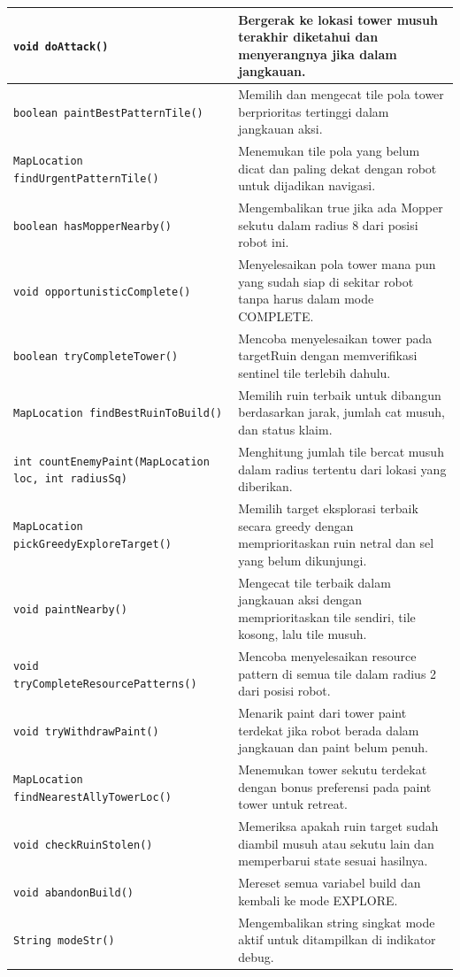 \documentclass{article}
\begin{document}
\begin{enumerate}[label=\alph*.]
\begin{longtable}{|p{}|p{}|}
\hline
\texttt{void doAttack()} & Bergerak ke lokasi tower musuh terakhir diketahui dan menyerangnya jika dalam jangkauan. \\
\hline
\texttt{boolean paintBestPatternTile()} & Memilih dan mengecat tile pola tower berprioritas tertinggi dalam jangkauan aksi. \\
\hline
\texttt{MapLocation findUrgentPatternTile()} & Menemukan tile pola yang belum dicat dan paling dekat dengan robot untuk dijadikan navigasi. \\
\hline
\texttt{boolean hasMopperNearby()} & Mengembalikan true jika ada Mopper sekutu dalam radius 8 dari posisi robot ini. \\
\hline
\texttt{void opportunisticComplete()} & Menyelesaikan pola tower mana pun yang sudah siap di sekitar robot tanpa harus dalam mode COMPLETE. \\
\hline
\texttt{boolean tryCompleteTower()} & Mencoba menyelesaikan tower pada targetRuin dengan memverifikasi sentinel tile terlebih dahulu. \\
\hline
\texttt{MapLocation findBestRuinToBuild()} & Memilih ruin terbaik untuk dibangun berdasarkan jarak, jumlah cat musuh, dan status klaim. \\
\hline
\texttt{int countEnemyPaint(MapLocation loc, int radiusSq)} & Menghitung jumlah tile bercat musuh dalam radius tertentu dari lokasi yang diberikan. \\
\hline
\texttt{MapLocation pickGreedyExploreTarget()} & Memilih target eksplorasi terbaik secara greedy dengan memprioritaskan ruin netral dan sel yang belum dikunjungi. \\
\hline
\texttt{void paintNearby()} & Mengecat tile terbaik dalam jangkauan aksi dengan memprioritaskan tile sendiri, tile kosong, lalu tile musuh. \\
\hline
\texttt{void tryCompleteResourcePatterns()} & Mencoba menyelesaikan resource pattern di semua tile dalam radius 2 dari posisi robot. \\
\hline
\texttt{void tryWithdrawPaint()} & Menarik paint dari tower paint terdekat jika robot berada dalam jangkauan dan paint belum penuh. \\
\hline
\texttt{MapLocation findNearestAllyTowerLoc()} & Menemukan tower sekutu terdekat dengan bonus preferensi pada paint tower untuk retreat. \\
\hline
\texttt{void checkRuinStolen()} & Memeriksa apakah ruin target sudah diambil musuh atau sekutu lain dan memperbarui state sesuai hasilnya. \\
\hline
\texttt{void abandonBuild()} & Mereset semua variabel build dan kembali ke mode EXPLORE. \\
\hline
\texttt{String modeStr()} & Mengembalikan string singkat mode aktif untuk ditampilkan di indikator debug. \\
\hline
\end{longtable}



\end{enumerate}
\end{document}
